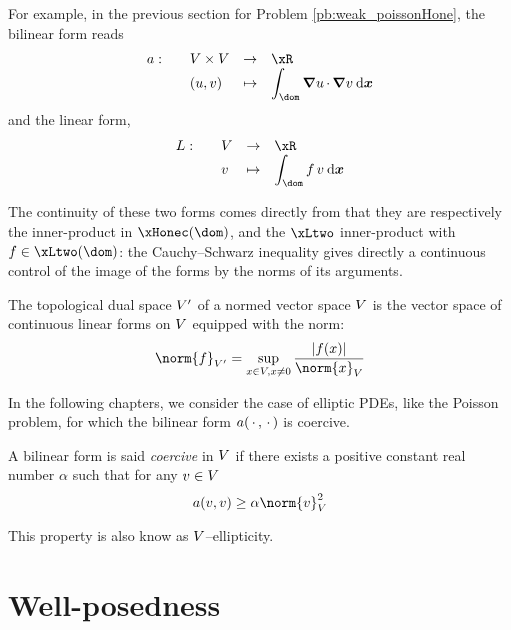 \medskip
For example, in the previous section for Problem \eqref{pb:weak_poissonHone}, the bilinear form reads
\begin{equation*}
\begin{array}{llll}
a:\quad& \xV\times \xV &\rightarrow& \xR \\
\hfill & (u,v)     &\mapsto    & \displaystyle\int_\dom \Grad u \xDot \Grad v \dxx
\end{array}
\end{equation*}
and the linear form,
\begin{equation*}
\begin{array}{llll}
L:\quad& \xV &\rightarrow& \xR \\
\hfill &   v &\mapsto    & \displaystyle\int_\dom f\,v \dxx
\end{array}
\end{equation*}

The continuity of these two forms comes directly from that they are respectively the inner-product in $\xHonec(\dom)$, and the $\xLtwo$ inner-product with $f \in \xLtwo(\dom)$: the Cauchy--Schwarz inequality gives directly a continuous control of the image of the forms by the norms of its arguments.

\medskip
\begin{dfntn}
The topological dual space ${V}'$ of a normed vector space ${V}$ is the vector space of continuous linear forms on ${V}$ equipped with the norm:
\begin{equation*}
\norm{f}_{\xV'} = \sup_{x \in \xV, x \neq 0} \dfrac{|f(x)|}{\norm{x}_\xV}
\end{equation*}
\end{dfntn}

\medskip

In the following chapters, we consider the case of elliptic PDEs, like the Poisson problem, for which the bilinear form $a(\,{\mathbf\cdot}\,,\,{\mathbf\cdot}\,)$ is coercive.
\begin{prpstn}[Coercivity]
A bilinear form is said \textit{coercive} in ${V}$ if there exists a positive constant real number $\alpha$ such that for any $v \in {V}$
\begin{equation*}
a( v, v ) \geq \alpha \norm{v}^2_\xV
\end{equation*}
\end{prpstn}
This property is also know as ${V}$--ellipticity.

\section{Well-posedness}

